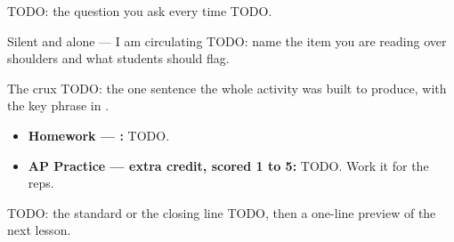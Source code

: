 \documentclass[aspectratio=169, 11pt]{beamer}
\begin{document}
\begin{frame}[t, plain]
\end{frame}

\begin{frame}[t, plain]
  \begin{block}{TODO: the question you ask every time}
    TODO.
  \end{block}
\end{frame}

\begin{frame}[t, plain]
  \begin{block}{Silent and alone --- I am circulating}
    TODO: name the item you are reading over shoulders and what students should flag.
  \end{block}
\end{frame}

\begin{frame}[t, plain]
  \begin{block}{The crux}
    TODO: the one sentence the whole activity was built to produce, with the key phrase in
    \redink{}.
  \end{block}
\end{frame}

\begin{frame}[t, plain]
  \begin{itemize}\setlength{\itemsep}{5pt}
    \item \textbf{Homework --- :} TODO.
    \item \textbf{AP Practice --- extra credit, scored 1 to 5:} TODO. Work it for the reps.
  \end{itemize}
  \begin{block}{TODO: the standard or the closing line}
    TODO, then a one-line preview of the next lesson.
  \end{block}
\end{frame}
\end{document}
